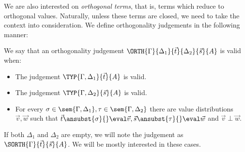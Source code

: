 We are also interested on \emph{orthogonal terms}, that is, terms which reduce to orthogonal values. Naturally, unless these terms are closed, we need to take the context into consideration. We define orthogonality judgements in the following manner:

\begin{definition}
    We say that an orthogonality judgement $\ORTH{\Gamma}{\Delta_1}{\vec{t}}{\Delta_2}{\vec{s}}{A}$ is valid when:
    \begin{itemize}
        \item The judgement $\TYP{\Gamma,\Delta_1}{\vec{t}}{A}$ is valid.
        \item The judgement $\TYP{\Gamma,\Delta_2}{\vec{s}}{A}$ is valid.
        \item For every $\sigma\in\sem{\Gamma,\Delta_1}, \tau\in\sem{\Gamma,\Delta_2}$ there are value distributions $\vec{v},\vec{w}$ such that $\vec{t}\ansubst{\sigma}{}\eval\vec{v}, \vec{s}\ansubst{\tau}{}\eval\vec{w}$ and $\vec{v}\perp\vec{w}$.
    \end{itemize}
\end{definition}

If both $\Delta_1$ and $\Delta_2$ are empty, we will note the judgement as $\SORTH{\Gamma}{\vec{t}}{\vec{s}}{A}$. We will be mostly interested in these cases.

